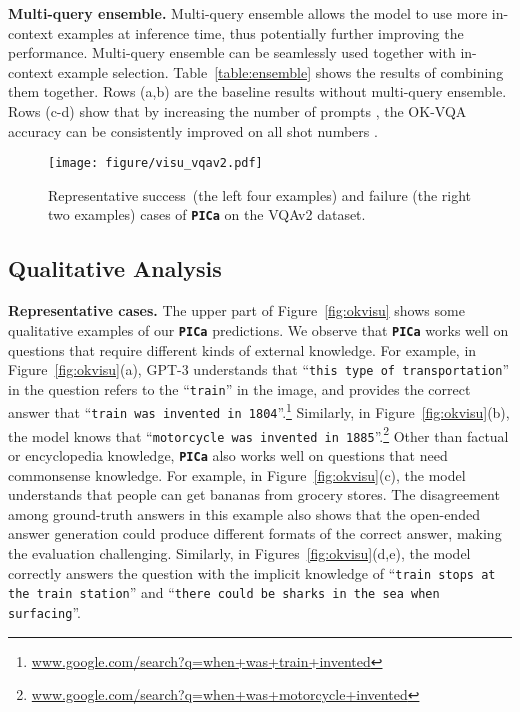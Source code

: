 \vspace{2mm}
\noindent\textbf{Multi-query ensemble.}
Multi-query ensemble allows the model to use more in-context examples at inference time, thus potentially further improving the performance. Multi-query ensemble can be seamlessly used together with in-context example selection. Table~\ref{table:ensemble} shows the results of combining them together. Rows (a,b) are the baseline results without multi-query ensemble. Rows (c-d) show that by increasing the number of prompts , the OK-VQA accuracy can be consistently improved on all shot numbers .


\begin{figure*}[t]
\begin{center}
  \centerline{\texttt{[image: figure/visu\_vqav2.pdf]}}
\end{center}
\vspace{-0.3in}
    \caption{\small Representative success~(the left four examples) and failure (the right two examples) cases of \textbf{\texttt{PICa}} on the VQAv2 dataset.
	}
\vspace{-0.1in}
\label{fig:vqavisu}
\end{figure*}

\subsection{Qualitative Analysis}
\label{sec:example}

\noindent\textbf{Representative cases.}
The upper part of Figure~\ref{fig:okvisu} shows some qualitative examples of our \textbf{\texttt{PICa}} predictions. We observe that \textbf{\texttt{PICa}} works well on questions that require different kinds of external knowledge. For example, in Figure~\ref{fig:okvisu}(a), GPT-3 understands that ``\texttt{this type of transportation}'' in the question refers to the ``\texttt{train}'' in the image, and provides the correct answer that ``\texttt{train was invented in 1804}''.\footnote{\url{www.google.com/search?q=when+was+train+invented}} Similarly, in Figure~\ref{fig:okvisu}(b), the model knows that ``\texttt{motorcycle was invented in 1885}''.\footnote{\url{www.google.com/search?q=when+was+motorcycle+invented}} Other than factual or encyclopedia knowledge, \textbf{\texttt{PICa}} also works well on questions that need commonsense knowledge. For example, in Figure~\ref{fig:okvisu}(c), the model understands that people can get bananas from grocery stores. The disagreement among ground-truth answers in this example also shows that the open-ended answer generation could produce different formats of the correct answer, making the evaluation challenging. Similarly, in Figures~\ref{fig:okvisu}(d,e), the model correctly answers the question with the implicit knowledge of ``\texttt{train stops at the train station}'' and ``\texttt{there could be sharks in the sea when surfacing}''.

